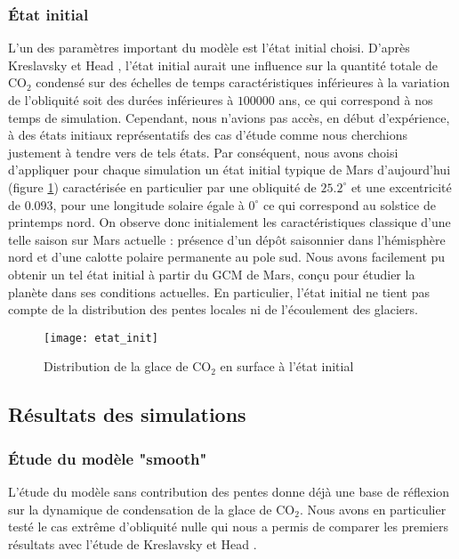 \documentclass[11pt,a4paper]{article}
\begin{document}
\subsubsection{\' Etat initial}
L'un des paramètres important du modèle est l'état initial choisi. D'après Kreslavsky et Head \citep{Kres:05}, l'état initial aurait une influence sur la quantité totale de CO$_2$ condensé sur des échelles de temps caractéristiques inférieures à la variation de l'obliquité soit des durées inférieures à $100000$ ans, ce qui correspond à nos temps de simulation. Cependant, nous n'avions pas accès, en début d'expérience, à des états initiaux représentatifs des cas d'étude comme nous cherchions justement à tendre vers de tels états. Par conséquent, nous avons choisi d'appliquer pour chaque simulation un état initial typique de Mars d'aujourd'hui (figure \ref{etat_init}) caractérisée en particulier par une obliquité de $25.2^\circ$ et une excentricité de $0.093$, pour une longitude solaire égale à $0^\circ$ ce qui correspond au solstice de printemps nord. On observe donc initialement les caractéristiques classique d'une telle saison sur Mars actuelle : présence d'un dépôt saisonnier dans l'hémisphère nord et d'une calotte polaire permanente au pole sud. Nous avons facilement pu obtenir un tel état initial à partir du GCM de Mars, conçu pour étudier la planète dans ses conditions actuelles. En particulier, l'état initial ne tient pas compte de la distribution des pentes locales ni de l'écoulement des glaciers. \\

\begin{figure}[h!]
\begin{center}
\texttt{[image: etat\_init]}
\caption{Distribution de la glace de CO$_2$ en surface à l'état initial}
\label{etat_init}
\end{center}
\end{figure}

\subsection{Résultats des simulations}
\subsubsection{\' Etude du modèle "smooth"}
\label{smooth_section}
L'étude du modèle sans contribution des pentes donne déjà une base de réflexion sur la dynamique de condensation de la glace de CO$_2$. Nous avons en particulier testé le cas extrême d'obliquité nulle qui nous a permis de comparer les premiers résultats avec l'étude de Kreslavsky et Head \citep{Kres:05}.
\end{document}
